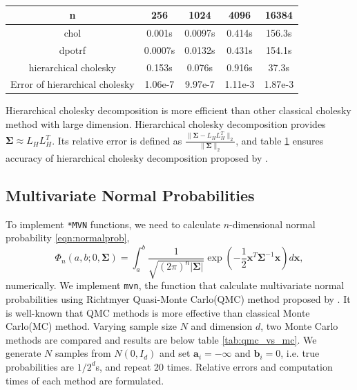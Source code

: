 \begin{table}[h]
	\centering
	{
		\begin{tabular}{@{}ccccc@{}}
			\toprule
			n & 256 & 1024 & 4096 & 16384 \\ \midrule
			chol & 0.001s & 0.0097s & 0.414s & 156.3s \\
			dpotrf & 0.0007s & 0.0132s & 0.431s & 154.1s \\
			hierarchical cholesky & 0.153s & 0.076s & 0.916s & 37.3s \\
			Error of hierarchical cholesky & 1.06e-7 & 9.97e-7 & 1.11e-3 & 1.87e-3 \\  \bottomrule
		\end{tabular}%
	}
	\caption{}
	\label{tab:table1}
\end{table}
Hierarchical cholesky decomposition is more efficient than other classical cholesky method with large dimension. Hierarchical cholesky decomposition provides $\boldsymbol{\Sigma}\approx L_HL_H^T$. Its relative error is defined as $\frac{\lVert\boldsymbol{\Sigma}-L_HL_H^T\rVert_2}{\lVert\boldsymbol{\Sigma}\rVert_2}$, and table \ref{tab:table1} ensures accuracy of hierarchical cholesky decomposition proposed by \citet{hackbusch2015hierarchical}.


\subsection{Multivariate Normal Probabilities} 

To implement \texttt{*MVN} functions, we need to calculate $n$-dimensional normal probability \eqref{eqn:normalprob},
$$
\Phi_n(a, b; 0, \boldsymbol{\Sigma}) = \int_a^b \frac{1}{\sqrt{(2\pi)^n |\boldsymbol{\Sigma}|}} \exp\left( -\frac{1}{2} \mathbf{x}^T \boldsymbol{\Sigma}^{-1} \mathbf{x} \right) d\mathbf{x},
$$ 
numerically. We implement \texttt{mvn}, the function that calculate multivariate normal probabilities using Richtmyer Quasi-Monte Carlo(QMC) method proposed by \citet{genz2009computation}. It is well-known that QMC methods is more effective than classical Monte Carlo(MC) method. Varying sample size $N$ and dimension $d$, two Monte Carlo methods are compared and results are below table \ref{tab:qmc_vs_mc}. We generate $N$ samples from $N(0, I_d)$ and set $\mathbf{a}_i = -\infty$ and $\mathbf{b}_i = 0$, i.e. true probabilities are $1/2^d$s, and repeat 20 times. Relative errors and computation times of each method are formulated.

